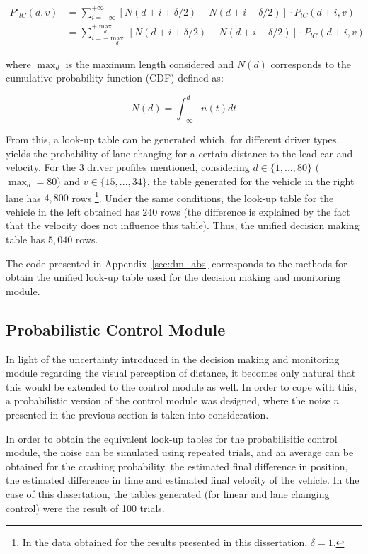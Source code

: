 \begin{equation}
\begin{aligned}
	P'_{lC}(d,v) & = \sum_{i = -\infty}^{+\infty} [N(d + i + \delta/2) - N(d + i - \delta/2)] \cdot P_{lC}(d + i,v) \\
	& = \sum_{i = -\max_d}^{+\max_d} [N(d + i + \delta/2) - N(d + i - \delta/2)] \cdot P_{lC}(d + i,v)
\end{aligned}
\end{equation}

where $\max_d$ is the maximum length considered and $N(d)$ corresponds to the cumulative probability function (CDF) defined as:

\begin{equation}
	N(d) = \int_{-\infty}^d n(t) dt
\end{equation}

From this, a look-up table can be generated which, for different driver types, yields the probability of lane changing for a certain distance to the lead car and velocity. For the 3 driver profiles mentioned, considering $d \in \{1,...,80\}$ ($\max_d = 80$) and $v \in \{15,...,34\}$, the table generated for the vehicle in the right lane has $4,800$ rows \footnote{In the data obtained for the results presented in this dissertation, $\delta = 1$.}. Under the same conditions, the look-up table for the vehicle in the left obtained has $240$ rows (the difference is explained by the fact that the velocity does not influence this table). Thus, the unified decision making table has $5,040$ rows.

The code presented in Appendix~\ref{sec:dm_abs} corresponds to the methods for obtain the unified look-up table used for the decision making and monitoring module.

\subsection{Probabilistic Control Module}

In light of the uncertainty introduced in the decision making and monitoring module regarding the visual perception of distance, it becomes only natural that this would be extended to the control module as well. In order to cope with this, a probabilistic version of the control module was designed, where the noise $n$ presented in the previous section is taken into consideration. 

In order to obtain the equivalent look-up tables for the probabilisitic control module, the noise can be simulated using repeated trials, and an average can be obtained for the crashing probability, the estimated final difference in position, the estimated difference in time and estimated final velocity of the vehicle. In the case of this dissertation, the tables generated (for linear and lane changing control) were the result of 100 trials.

